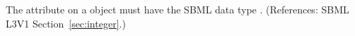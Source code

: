 The  attribute on a \Unit object
must have the SBML data type .  (References: SBML
L3V1 Section~\ref{sec:integer}.)
